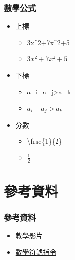 \documentclass[mathserif]{beamer}
\begin{document}
\begin{frame}
    \frametitle{數學公式}
    \begin{itemize}
        \item 上標
            \begin{itemize}
                \item 3x\^{}2+7x\^{}2+5
                \item $3x^2+7x^2+5$
            \end{itemize}
        \item 下標
            \begin{itemize}
                \item a\_{}i+a\_{}j>a\_{}k
                \item $a_i+a_j>a_k$
            \end{itemize}
        \item 分數
            \begin{itemize}
                \item \textbackslash frac\{1\}\{2\}
                \item $\frac{1}{2}$
            \end{itemize}
    \end{itemize}
\end{frame}

\section{參考資料}

\begin{frame}
    \frametitle{參考資料}   
    \begin{itemize}
        \item \href{https://youtu.be/mQamBS6uTOc}{教學影片}
        \item \href{https://hackmd.io/@CynthiaChuang/Basic-LaTeX-Commands}{數學符號指令}
    \end{itemize}
\end{frame}
\end{document}
